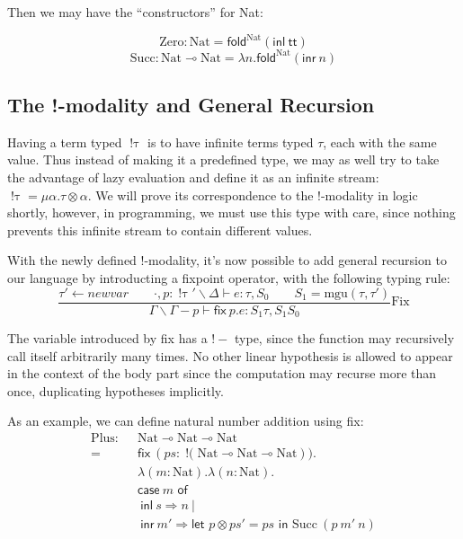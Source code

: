 \documentclass{article}
\newcommand{\bang}[1]{\operatorname{! #1}}
\newcommand{\mgu}[2]{\mathrm{mgu}(#1, #2)}
\newcommand{\newvar}{\mathit{newvar}}
\newcommand{\letin}[2]{\textsf{let } #1 \textsf{ in } #2}
\newcommand{\unit}{\textsf{tt}}
\newcommand{\inl}{\textsf{inl} ~}
\newcommand{\inr}{\textsf{inr} ~}
\newcommand{\fold}[2]{\textsf{fold}^{#1} #2}
\newcommand{\fix}[2]{\textsf{fix} ~ #1. #2}
\begin{document}
Then we may have the ``constructors'' for \textrm{Nat}:

\begin{displaymath}
\mathrm{Zero} : \mathrm{Nat} = \fold{\mathrm{Nat}}{(\inl \unit)}
\end{displaymath}
\begin{displaymath}
\mathrm{Succ} : \mathrm{Nat} \multimap \mathrm{Nat} = \lambda n. \fold{\mathrm{Nat}}{(\inr n)}
\end{displaymath}

\subsection{The !-modality and General Recursion}

Having a term typed $\bang \tau$ is to have infinite terms typed $\tau$, each with the same value. Thus instead of making it a predefined type, we may as well try to take the advantage of lazy evaluation and define it as an infinite stream: $\bang \tau = \mu \alpha. \tau \otimes \alpha$. We will prove its correspondence to the !-modality in logic shortly, however, in programming, we must use this type with care, since nothing prevents this infinite stream to contain different values.

With the newly defined !-modality, it's now possible to add general recursion to our language by introducting a fixpoint operator, with the following typing rule:
\begin{displaymath}
  \frac
    {\tau' \leftarrow \newvar \qquad
    \cdot, p : \bang \tau' \backslash \Delta \vdash e : \tau, S_0 \qquad
    S_1 = \mgu{\tau}{\tau'}}
    {\Gamma \backslash \Gamma - p \vdash \fix{p}{e} : S_1 \tau, S_1 S_0}
  \mathrm{Fix}
\end{displaymath}

The variable introduced by \textsf{fix} has a $!-$ type, since the function may recursively call itself arbitrarily many times. No other linear hypothesis is allowed to appear in the context of the body part since the computation may recurse more than once, duplicating hypotheses implicitly.

As an example, we can define natural number addition using \textsf{fix}:
\begin{align*}
  \mathrm{Plus} : \operatorname{ } & \mathrm{Nat} \multimap \mathrm{Nat} \multimap \mathrm{Nat}\\
\text{= } & \fix{(ps : \bang (\mathrm{Nat} \multimap \mathrm{Nat} \multimap \mathrm{Nat}))}{} \\
  & \lambda (m : \mathrm{Nat}). \lambda (n : \mathrm{Nat}). \\
  & \textsf{case} ~ m \textsf{ of } \\
  & ~ \textsf{inl} ~ s \Rightarrow n ~ | \\
  & ~ \textsf{inr} ~ m' \Rightarrow \letin{p \otimes ps' = ps}{\textrm{Succ} ~ (p ~ m' ~ n)}
\end{align*}
\end{document}

